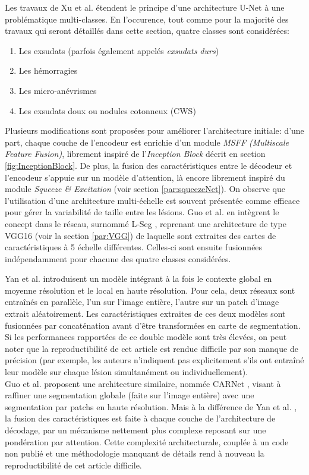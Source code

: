 Les travaux de Xu et al. \cite{xuFFUNetFeatureFusion2021} étendent le principe d'une architecture U-Net à une problématique multi-classes. En l'occurence, tout comme pour la majorité des travaux qui seront détaillés dans cette section, quatre classes sont considérées:
\begin{enumerate}
	\item Les exsudats (parfois également appelés \textit{exsudats durs})
	\item Les hémorragies
	\item Les micro-anévrismes
	\item Les exsudats doux ou nodules cotonneux (\ac{CWS})
\end{enumerate}
Plusieurs modifications sont proposées pour améliorer l'architecture initiale: d'une part, chaque couche de l'encodeur est enrichie d'un module \textit{MSFF (Multiscale Feature Fusion)}, librement inspiré de l'\textit{Inception Block} décrit en section \ref{fig:InceptionBlock}. De plus, la fusion des caractéristiques entre le décodeur et l'encodeur s'appuie sur un modèle d'attention, là encore librement inspiré du module \textit{Squeeze \&  Excitation} (voir section \ref{par:squeezeNet}). On observe que l'utilisation d'une architecture multi-échelle est souvent présentée comme efficace pour gérer la variabilité de taille entre les lésions. Guo et al.  en intègrent le concept dans le réseau, surnommé L-Seg \cite{guoLSegEndtoendUnified2019}, reprenant une architecture de type VGG16 (voir la section \ref{par:VGG}) de laquelle sont extraites des cartes de caractéristiques à 5 échelle différentes. Celles-ci sont ensuite fusionnées indépendamment pour chacune des quatre classes considérées.
 
Yan et al. \cite{yanLearningMutuallyLocalGlobal2019a} introduisent un modèle intégrant à la fois le contexte global en moyenne résolution et le local en haute résolution. Pour cela, deux réseaux sont entraînés en parallèle, l'un sur l'image entière, l'autre sur un patch d'image extrait aléatoirement. Les caractéristiques extraites de ces deux modèles sont fusionnées par concaténation avant d'être transformées en carte de segmentation. Si les performances rapportées de ce double modèle sont très élevées, on peut noter que la reproductibilité de cet article est rendue difficile par son manque de précision (par exemple, les auteurs n'indiquent pas explicitement s'ils ont entraîné leur modèle sur chaque lésion simultanément ou individuellement). \\
Guo et al. proposent une architecture similaire, nommée CARNet \cite{guoCARNetCascadeAttentive2022}, visant à raffiner une segmentation globale (faite sur l'image entière) avec une segmentation par patchs en haute résolution. Mais à la différence de Yan et al. \cite{yanLearningMutuallyLocalGlobal2019a}, la fusion des caractéristiques est faite à chaque couche de l'architecture de décodage, par un mécanisme nettement plus complexe reposant sur une pondération par attention. Cette complexité architecturale, couplée à un code non publié et une méthodologie manquant de détails rend à nouveau la reproductibilité de cet article difficile.
\\

